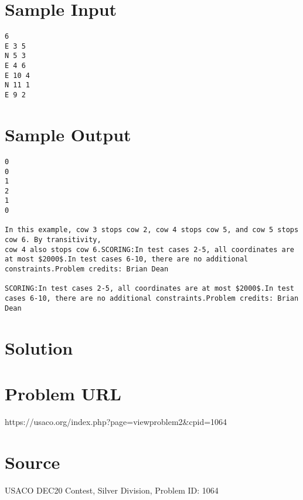 \documentclass[12pt]{article}
\begin{document}
\section*{Sample Input}
\begin{verbatim}
6
E 3 5
N 5 3
E 4 6
E 10 4
N 11 1
E 9 2
\end{verbatim}

\section*{Sample Output}
\begin{verbatim}
0
0
1
2
1
0

In this example, cow 3 stops cow 2, cow 4 stops cow 5, and cow 5 stops cow 6. By transitivity, 
cow 4 also stops cow 6.SCORING:In test cases 2-5, all coordinates are at most $2000$.In test cases 6-10, there are no additional constraints.Problem credits: Brian Dean

SCORING:In test cases 2-5, all coordinates are at most $2000$.In test cases 6-10, there are no additional constraints.Problem credits: Brian Dean
\end{verbatim}

\section*{Solution}


\section*{Problem URL}
https://usaco.org/index.php?page=viewproblem2&cpid=1064

\section*{Source}
USACO DEC20 Contest, Silver Division, Problem ID: 1064
\end{document}
